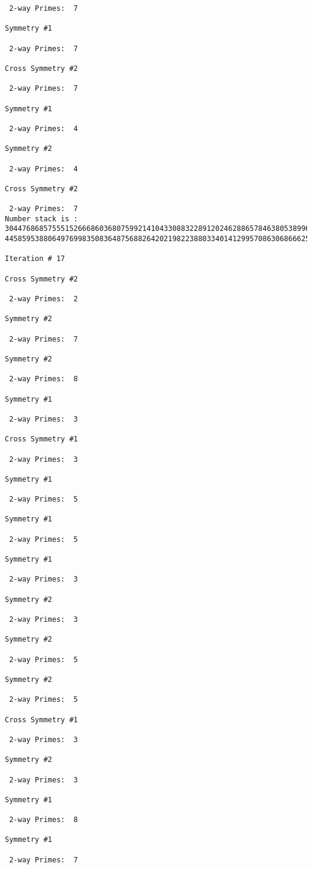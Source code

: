{{{{\begin{verbatim}
 2-way Primes: 	7

Symmetry #1

 2-way Primes: 	7

Cross Symmetry #2

 2-way Primes: 	7

Symmetry #1

 2-way Primes: 	4

Symmetry #2

 2-way Primes: 	4

Cross Symmetry #2

 2-way Primes: 	7
Number stack is :
30447686857555152666860368075992141043308832289120246288657846380538996794608835958544046240163340857
44585953880649769983508364875688264202198223880334014129957086306866625155575868674403758043361042640

Iteration #	17

Cross Symmetry #2

 2-way Primes: 	2

Symmetry #2

 2-way Primes: 	7

Symmetry #2

 2-way Primes: 	8

Symmetry #1

 2-way Primes: 	3

Cross Symmetry #1

 2-way Primes: 	3

Symmetry #1

 2-way Primes: 	5

Symmetry #1

 2-way Primes: 	5

Symmetry #1

 2-way Primes: 	3

Symmetry #2

 2-way Primes: 	3

Symmetry #2

 2-way Primes: 	5

Symmetry #2

 2-way Primes: 	5

Cross Symmetry #1

 2-way Primes: 	3

Symmetry #2

 2-way Primes: 	3

Symmetry #1

 2-way Primes: 	8

Symmetry #1

 2-way Primes: 	7


\end{verbatim}}}}}
